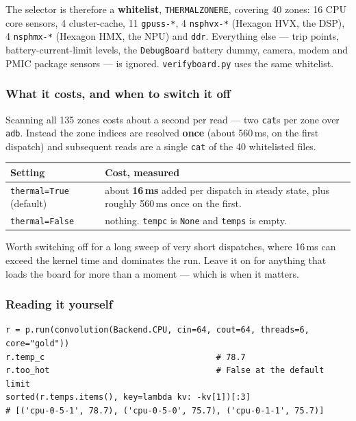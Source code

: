 \documentclass[11pt,a4paper]{article}
\newcommand{\code}[1]{\texttt{\let\_\breakableunderscore #1}}
\newcommand{\breakableunderscore}{\textunderscore\allowbreak}
\begin{document}
The selector is therefore a \textbf{whitelist}, \code{\_THERMAL\_ZONE\_RE},
covering 40 zones: 16 CPU core sensors, 4 cluster-cache, 11 \code{gpuss-*},
4 \code{nsphvx-*} (Hexagon HVX, the DSP), 4 \code{nsphmx-*} (Hexagon HMX, the
NPU) and \code{ddr}. Everything else --- trip points, battery-current-limit
levels, the \code{Debug\_Board} battery dummy, camera, modem and PMIC package
sensors --- is ignored. \code{verify\_board.py} uses the same whitelist.

\subsubsection*{What it costs, and when to switch it off}

Scanning all 135 zones costs about a second per read --- two \code{cat}s per
zone over \code{adb}. Instead the zone indices are resolved \textbf{once}
(about 560\,ms, on the first dispatch) and subsequent reads are a single
\code{cat} of the 40 whitelisted files.

\begin{longtable}{@{}p{4.6cm}p{10.1cm}@{}}
\toprule
\textbf{Setting} & \textbf{Cost, measured} \\
\midrule
\endhead
\code{thermal=True} (default) & about \textbf{16\,ms} added per dispatch in
  steady state, plus roughly 560\,ms once on the first. \\
\code{thermal=False} & nothing. \code{temp\_c} is \code{None} and
  \code{temps} is empty. \\
\bottomrule
\end{longtable}

\noindent Worth switching off for a long sweep of very short dispatches, where
16\,ms can exceed the kernel time and dominates the run. Leave it on for
anything that loads the board for more than a moment --- which is when it
matters.

\subsubsection*{Reading it yourself}

\begin{lstlisting}
r = p.run(convolution(Backend.CPU, cin=64, cout=64, threads=6, core="gold"))
r.temp_c                                   # 78.7
r.too_hot                                  # False at the default limit
sorted(r.temps.items(), key=lambda kv: -kv[1])[:3]
# [('cpu-0-5-1', 78.7), ('cpu-0-5-0', 75.7), ('cpu-0-1-1', 75.7)]
\end{lstlisting}
\end{document}
